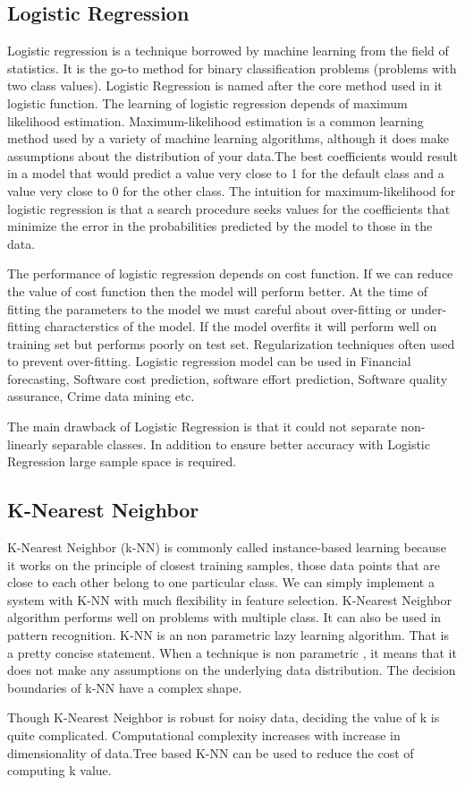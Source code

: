 \documentclass[12pt,a4paper]{report}
\begin{document}
\subsection{Logistic Regression}
Logistic regression is a technique borrowed by machine learning from the field of statistics. It is the go-to method for binary classification problems (problems with two class values). Logistic Regression is named after the core method used in it logistic function. The learning of logistic regression depends of maximum likelihood estimation. Maximum-likelihood estimation is a common learning method used by a variety of machine learning algorithms, although it does make assumptions about the distribution of your data.The best coefficients would result in a model that would predict a value very close to 1 for the default class and a value very close to 0 for the other class. The intuition for maximum-likelihood for logistic regression is that a search procedure seeks values for the coefficients that minimize the error in the probabilities predicted by the model to those in the data.
\par
\vspace{0.5cm}
The performance of logistic regression depends on cost function. If we can reduce the value of cost function then the model will perform better. At the time of fitting the parameters to the model we must careful about over-fitting or under-fitting characterstics of the model. If the model overfits it will perform well on training set but performs poorly on test set. Regularization techniques often used to prevent over-fitting. Logistic regression model can be used in Financial forecasting, Software cost prediction, software effort prediction, Software quality assurance, Crime data mining etc. 
\par
\vspace{0.5cm}
The main drawback of Logistic Regression is that it could not separate non-linearly separable classes. In addition to ensure better accuracy with Logistic Regression large sample space is required.

\subsection{K-Nearest Neighbor}
K-Nearest Neighbor (k-NN) is commonly called instance-based learning because it works on the principle of closest training samples, those data points that are close to each other belong to one particular class. We can simply implement a system with K-NN with much flexibility in feature selection. K-Nearest Neighbor algorithm performs well on problems with multiple class. It can also be used in pattern recognition. K-NN is an non parametric lazy learning algorithm. That is a pretty concise statement. When a technique is non parametric , it means that it does not make any assumptions on the underlying data distribution. The decision boundaries of k-NN have a complex shape.
\par
\vspace{0.5cm}
 Though K-Nearest Neighbor is robust for noisy data, deciding the value of k is quite complicated. Computational complexity increases with increase in dimensionality of data.Tree based K-NN can be used to reduce the cost of computing k value.
 
\end{document}
